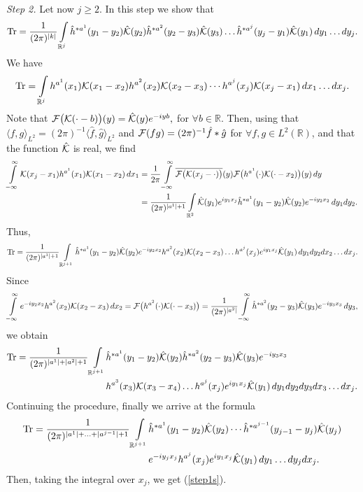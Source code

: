 \documentclass{article}
\numberwithin{equation}{section}
\newcommand{\mR}{\mathbb{R}}
\newcommand{\FF}{{\cal F}}
\newcommand{\KK}{{\cal K}}
\newcommand{\ov}{\overline}
\newcommand{\ds}{\displaystyle{}}
\newcommand{\ran}{\rangle}
\newcommand{\lan}{\langle}
\newcommand{\fr}{\frac}
\newcommand{\ili}{\int\limits}
\newcommand{\ilif}{\ili_{-\infty}^\infty}
\newcommand{\lbl}{\label}
\newcommand{\bee}{\begin{equation}}
\newcommand{\eee}{\end{equation}}
\newcommand{\non}{\nonumber}
\begin{document}
{\it Step 2.} Let now $j\geq 2$.
In this step we show that
\bee\lbl{step1s}
\mbox{Tr}
            = \fr{1}{(2\pi)^{|k|}}\ili_{\mR^j}
                                                            \hat h^{*a^1} (y_1-y_2)\hat \KK (y_2)
                                                            \hat h^{*a^2} (y_2-y_3)\hat \KK (y_3)
                                                            \ldots
                                                            \hat h^{*a^j} (y_j-y_1) \hat \KK (y_1)
                                                            \,dy_1\ldots dy_j.
\eee
We have
$$
\mbox{Tr}
            = \ili_{\mR^j}
                                    h^{a^1}(x_1)\KK(x_1-x_2) h^{a^2}(x_2)\KK(x_2-x_3)
                                    \cdots
                                    h^{a^j}(x_j)\KK(x_j-x_1)\,dx_1\ldots dx_j.
$$
Note that
$\FF\big(\KK(\cdot-b)\big)(y)=\hat \KK(y)e^{-iyb},$
for $\forall b\in\mR$.
Then, using that
$\lan f,g \ran_{L^2}=(2\pi)^{-1}\lan \hat f,\hat g \ran_{L^2}$
and
$\FF(fg)=(2\pi)^{-1}\hat f*\hat g$ for $\forall f,g\in L^2(\mR)$,
and that the function $\hat \KK$ is real,
we find
\begin{align} \non
\ilif \KK(x_j-x_1)h^{a^1}(x_1)\KK(x_1-x_2)\, dx_1
        &=\fr{1}{2\pi}\ilif
                \ov{\FF\big(\KK(x_j-\cdot)\big)}(y)\FF\big(h^{a^1}(\cdot)\KK(\cdot-x_2)\big)(y)\, dy
                \\ \non
        &=\fr{1}{(2\pi)^{|a^1|+1}}\ili_{\mR^2}\hat\KK(y_1) e^{iy_1x_j} \hat h^{*a^1}(y_1-y_2)\hat \KK(y_2) e^{-i y_2 x_2} \,dy_1dy_2.
\end{align}
Thus,
\bee\non
\mbox{Tr}=
            \fr{1}{(2\pi)^{|a^1|+1}}\ili_{\mR^{j+1}}
                \hat h^{*a^1}(y_1-y_2)\hat \KK(y_2) e^{-i y_2 x_2}  h^{a^2}(x_2) \KK(x_2-x_3)\ldots h^{a^j}(x_j)
                 e^{iy_1x_j}\hat\KK(y_1)
                \,dy_1dy_2dx_2\ldots d x_j.
\eee
Since
$$
\ds{\ilif e^{-i y_2 x_2}  h^{a^2}(x_2) \KK(x_2-x_3) \,dx_2
    = \FF\big(h^{a^2}(\cdot)\KK(\cdot-x_3)\big)= \fr{1}{(2\pi)^{|a^2|}}\ilif \hat h^{*a^2}(y_2-y_3) \hat \KK(y_3) e^{-iy_3x_3} \,dy_3},
$$
we obtain
\begin{align}\non
\mbox{Tr}=
            \fr{1}{(2\pi)^{|a^1|+|a^2|+1}}\ili_{\mR^{j+1}}
                & \hat h^{*a^1}(y_1-y_2)\hat \KK(y_2)
                \hat h^{*a^2}(y_2-y_3)\hat \KK(y_3) e^{-i y_3 x_3}
                \\\non
                &h^{a^3}(x_3) \KK(x_3-x_4)
                \ldots h^{a^j}(x_j)e^{iy_1x_j}\hat\KK(y_1)
                \,dy_1dy_2dy_3dx_3\ldots d x_j.
\end{align}
Continuing the procedure, finally we arrive at the formula
\begin{align}\non
\mbox{Tr}
    = \fr{1}{(2\pi)^{|a^1|+\ldots+|a^{j-1}|+1}}\ili_{\mR^{j+1}}
        &\hat h^{*a^1}(y_1-y_2)\hat\KK(y_2)
            \cdots
            \hat h^{*a^{j-1}}(y_{j-1}-y_j)\hat \KK(y_j)
            \\ \non
        &e^{-i y_j x_j}
            h^{a^j}(x_j)e^{iy_1x_j}\hat\KK(y_1)
            \,dy_1\ldots dy_jdx_j.
\end{align}
Then, taking the integral over $x_j$, we get (\ref{step1s}).
\end{document}

